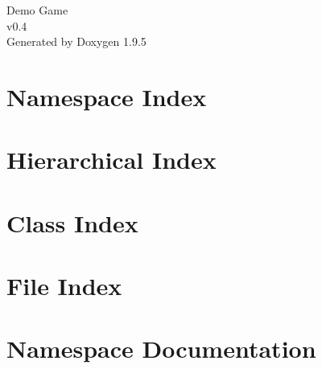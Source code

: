 \documentclass[twoside]{book}
\newcommand{\+}{\discretionary{\mbox{\scriptsize$\hookleftarrow$}}{}{}}
\newcommand{\clearemptydoublepage}{%
    \newpage{\pagestyle{empty}\cleardoublepage}%
  }
\begin{document}
  \raggedbottom
    \hypersetup{pageanchor=false,
                bookmarksnumbered=true,
                pdfencoding=unicode
               }
  \begin{titlepage}
  \vspace*{7cm}
  \begin{center}%
  {\Large Demo Game}\\
  [1ex]\large v0.\+4 \\
  \vspace*{1cm}
  {\large Generated by Doxygen 1.9.5}\\
  \end{center}
  \end{titlepage}
  \clearemptydoublepage
  \tableofcontents
  \clearemptydoublepage
  \hypersetup{pageanchor=true}
\chapter{Namespace Index}

\chapter{Hierarchical Index}

\chapter{Class Index}

\chapter{File Index}

\chapter{Namespace Documentation}


















\end{document}
